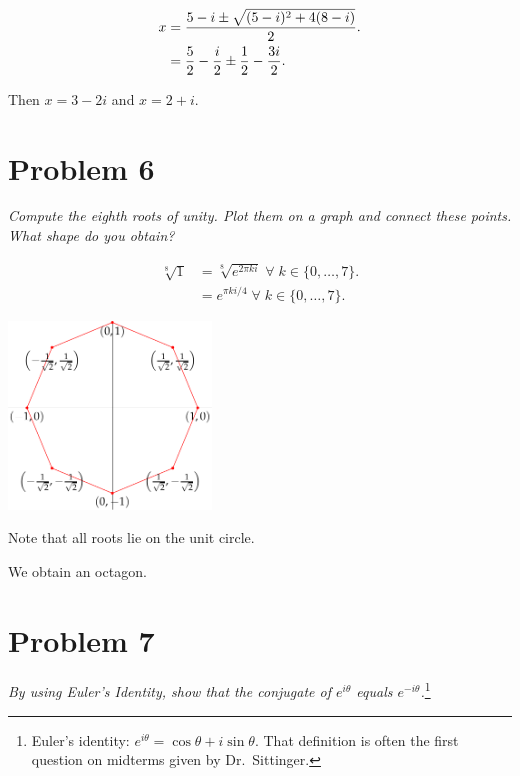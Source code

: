 \documentclass{tufte-handout}
\begin{document}
\begin{align*}
  x &= {5 - i \pm \sqrt{(5 - i)^2 + 4(8 - i)} \over 2}.\\
    &= {5 \over 2} - {i \over 2} \pm {1 \over 2} - {3 i \over 2}.
\end{align*}

Then $x = 3 - 2 i$ and $x = 2 + i$.

\section{Problem 6}

\begin{description}
\item \textit{Compute the eighth roots of unity. Plot them on a graph and
  connect these points. What shape do you obtain?}
\end{description}

\begin{align*}
  \sqrt[8]{1} &= \sqrt[8]{e^{2 \pi k i}} \; \forall \; k \in
                \{0,\ldots,7\}.\\
              &= e^{\pi k i / 4} \; \forall \; k \in \{0,\ldots,7\}.
\end{align*}

\begin{marginfigure}
  \centering
  \includegraphics[height=5cm]{tpr6.pdf}
  \caption{Note that all roots lie on the unit circle.}
\end{marginfigure}

We obtain an octagon.

\section{Problem 7}

\begin{description}
\item \textit{By using Euler's Identity, show that the conjugate of
    $e^{i \theta}$ equals $e^{-i \theta}$.}\footnote{Euler's identity:
    $e^{i\theta} = \cos\theta + i\sin\theta$. That definition is often
    the first question on midterms given by Dr.\ Sittinger.}
\end{description}
\end{document}
